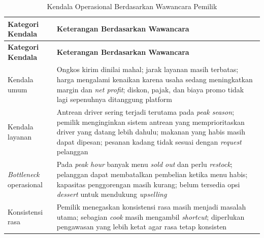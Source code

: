 \begingroup
\begin{xltabular}{\textwidth}{|Z{3.4cm}|Y|}
\caption{Kendala Operasional Berdasarkan Wawancara Pemilik}
\label{tab:kendala_wawancara} \\
        \toprule
        \textbf{Kategori Kendala}       & \textbf{Keterangan Berdasarkan Wawancara}                                                                                                                                                                                                                         \\ \hline
        \midrule
\endfirsthead
{}
        \toprule
        \textbf{Kategori Kendala}       & \textbf{Keterangan Berdasarkan Wawancara}                                                                                                                                                                                                                         \\ \hline
        \midrule
\endhead
{}
\endfoot
        \bottomrule
        \endlastfoot
        Kendala umum                    & Ongkos kirim dinilai mahal; jarak layanan masih terbatas; harga mengalami kenaikan karena usaha sedang meningkatkan margin dan \textit{net profit}; diskon, pajak, dan biaya promo tidak lagi sepenuhnya ditanggung platform                                      \\ \hline
        Kendala layanan                 & Antrean driver sering terjadi terutama pada \textit{peak season}; pemilik menginginkan sistem antrean yang memprioritaskan driver yang datang lebih dahulu; makanan yang habis masih dapat dipesan; pesanan kadang tidak sesuai dengan \textit{request} pelanggan \\ \hline
        \textit{Bottleneck} operasional & Pada \textit{peak hour} banyak menu \textit{sold out} dan perlu \textit{restock}; pelanggan dapat membatalkan pembelian ketika menu habis; kapasitas penggorengan masih kurang; belum tersedia opsi \textit{dessert} untuk mendukung \textit{upselling}           \\ \hline
        Konsistensi rasa                & Pemilik menegaskan konsistensi rasa masih menjadi masalah utama; sebagian \textit{cook} masih mengambil \textit{shortcut}; diperlukan pengawasan yang lebih ketat agar rasa tetap konsisten                                                                       \\ \hline
        \bottomrule
    
\end{xltabular}
\endgroup

